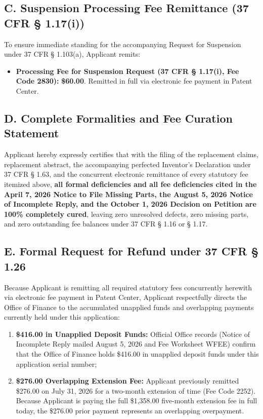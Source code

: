 \documentclass[11pt,letterpaper]{article}
\begin{document}
\subsection*{C. Suspension Processing Fee Remittance (37 CFR \S{} 1.17(i))}
To ensure immediate standing for the accompanying Request for Suspension under 37 CFR \S{} 1.103(a), Applicant remits:
\begin{itemize}[leftmargin=*]
    \item \textbf{Processing Fee for Suspension Request (37 CFR \S{} 1.17(i), Fee Code 2830):} \textbf{\$60.00}. Remitted in full via electronic fee payment in Patent Center.
\end{itemize}

\subsection*{D. Complete Formalities and Fee Curation Statement}
Applicant hereby expressly certifies that with the filing of the replacement claims, replacement abstract, the accompanying perfected Inventor's Declaration under 37 CFR \S{} 1.63, and the concurrent electronic remittance of every statutory fee itemized above, \textbf{all formal deficiencies and all fee deficiencies cited in the April 7, 2026 Notice to File Missing Parts, the August 5, 2026 Notice of Incomplete Reply, and the October 1, 2026 Decision on Petition are 100\% completely cured}, leaving zero unresolved defects, zero missing parts, and zero outstanding fee balances under 37 CFR \S{} 1.16 or \S{} 1.17.

\subsection*{E. Formal Request for Refund under 37 CFR \S{} 1.26}
Because Applicant is remitting all required statutory fees concurrently herewith via electronic fee payment in Patent Center, Applicant respectfully directs the Office of Finance to the accumulated unapplied funds and overlapping payments currently held under this application:
\begin{enumerate}[leftmargin=*]
    \item \textbf{\$416.00 in Unapplied Deposit Funds:} Official Office records (Notice of Incomplete Reply mailed August 5, 2026 and Fee Worksheet WFEE) confirm that the Office of Finance holds \$416.00 in unapplied deposit funds under this application serial number;
    \item \textbf{\$276.00 Overlapping Extension Fee:} Applicant previously remitted \$276.00 on July 31, 2026 for a two-month extension of time (Fee Code 2252). Because Applicant is paying the full \$1,358.00 five-month extension fee in full today, the \$276.00 prior payment represents an overlapping overpayment.
\end{enumerate}
\end{document}
